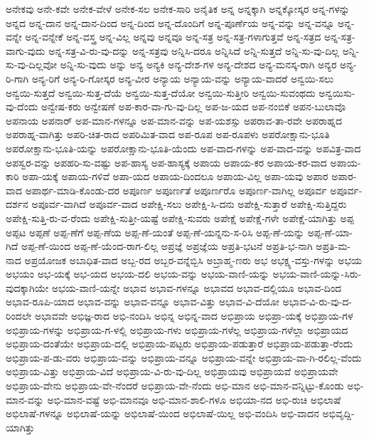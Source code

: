 ಅನೇಕವು
ಅನೇ-ಕವೇ
ಅನೇಕ-ವೇಳೆ
ಅನೇಕ-ಸಲ
ಅನೇಕ-ಸಾರಿ
ಅನೈತಿಕ
ಅನ್ನ
ಅನ್ನಕ್ಕಾಗಿ
ಅನ್ನಕ್ಕೋಸ್ಕರ
ಅನ್ನ-ಗಳನ್ನು
ಅನ್ನದ
ಅನ್ನ-ದಾನ
ಅನ್ನ-ದಾನ-ದಿಂದ
ಅನ್ನ-ದಿಂದ
ಅನ್ನ-ದೊಂದಿಗೆ
ಅನ್ನ-ಪೂರ್ಣೆಯ
ಅನ್ನ-ವನ್ನು
ಅನ್ನ-ವನ್ನೂ
ಅನ್ನ-ವನ್ನೇ
ಅನ್ನ-ವನ್ನೇಕೆ
ಅನ್ನ-ವಸ್ತ್ರ
ಅನ್ನ-ವಿಲ್ಲ
ಅನ್ನವು
ಅನ್ನವೂ
ಅನ್ನ-ಸತ್ರ
ಅನ್ನ-ಸತ್ರ-ಗಳಾಗುತ್ತವೆ
ಅನ್ನ-ಸತ್ರದ
ಅನ್ನ-ಸತ್ರ-ವಾಗು-ವುದು
ಅನ್ನ-ಸತ್ರ-ವಿ-ರು-ವು-ದನ್ನು
ಅನ್ನ-ಸತ್ರವು
ಅನ್ನಿಸಿ-ದರೂ
ಅನ್ನಿಸಿದೆ
ಅನ್ನಿ-ಸುತ್ತದೆ
ಅನ್ನಿ-ಸು-ವು-ದಿಲ್ಲ
ಅನ್ನಿ-ಸು-ವು-ದಿಲ್ಲವೋ
ಅನ್ನಿ-ಸು-ವುದು
ಅನ್ನು
ಅನ್ಯ
ಅನ್ಯಕಿ
ಅನ್ಯ-ದೇಶ-ಗಳ
ಅನ್ಯ-ದೇಶದ
ಅನ್ಯ-ಮನಸ್ಕ-ರಾಗಿ
ಅನ್ಯರ
ಅನ್ಯ-ರಿ-ಗಾಗಿ
ಅನ್ಯ-ರಿಗೆ
ಅನ್ಯ-ರಿ-ಗೋಸ್ಕರ
ಅನ್ಯ-ವೀರ
ಅನ್ಯಾಯ
ಅನ್ಯಾಯ-ವನ್ನು
ಅನ್ಯಾಯ-ವಾದರೆ
ಅನ್ವಯಿ-ಸಲು
ಅನ್ವಯಿ-ಸುತ್ತದೆ
ಅನ್ವಯಿ-ಸುತ್ತ-ದೆಯೆ
ಅನ್ವಯಿ-ಸುತ್ತ-ದೆಯೋ
ಅನ್ವಯಿ-ಸುತ್ತೀರಿ
ಅನ್ವಯಿ-ಸುವಂಥದು
ಅನ್ವಯಿಸು-ವು-ದೆಂದು
ಅನ್ವೇಷ-ಕರು
ಅನ್ವೇಷಣೆ
ಅಪ-ಕಾರ-ವಾ-ಗು-ವು-ದಿಲ್ಲ
ಅಪ-ಜ-ಯದ
ಅಪ-ನಂಬಿಕೆ
ಅಪನ-ಬುಲಾವೊ
ಅಪನಾಯ
ಅಪನಾರ್
ಅಪ-ಮಾನ-ಗಳನ್ನೂ
ಅಪ-ಮಾನ-ವನ್ನು
ಅಪ-ಯಶಸ್ಸು
ಅಪರಾವ-ತಾ-ರವೇ
ಅಪರಾಹ್ನದ
ಅಪರಾಹ್ನ-ವಾಗಿತ್ತು
ಅಪರಿ-ಚಿತ-ರಾದ
ಅಪರಿಮಿತ-ವಾದ
ಅಪ-ರೂಪ
ಅಪ-ರೂಪಳು
ಅಪರೋಕ್ಷಾನು-ಭೂತಿ
ಅಪರೋಕ್ಷಾನು-ಭೂತಿ-ಯನ್ನು
ಅಪರೋಕ್ಷಾನು-ಭೂತಿ-ಯೆಂದು
ಅಪ-ವಾದ-ಗಳನ್ನು
ಅಪ-ವಾದ-ವನ್ನು
ಅಪವಿತ್ರ-ವಾದ
ಅಪಸ್ವರ-ವನ್ನು
ಅಪಹರಿ-ಸು-ವಷ್ಟು
ಅಪ-ಹಾಸ್ಯ
ಅಪ-ಹಾಸ್ಯಕ್ಕೆ
ಅಪಾಯ
ಅಪಾಯ-ಕರ
ಅಪಾಯ-ಕರ-ವಾದ
ಅಪಾಯ-ಕಾರಿ
ಅಪಾ-ಯಕ್ಕೆ
ಅಪಾಯ-ಗಳಿವೆ
ಅಪಾ-ಯದ
ಅಪಾಯ-ದಿಂದಲೂ
ಅಪಾಯ-ವಿಲ್ಲ
ಅಪಾ-ಯವು
ಅಪಾರ
ಅಪಾರ-ವಾದ
ಅಪಾರ್ಥ-ಮಾಡಿ-ಕೊಂಡು-ದರ
ಅಪೂರ್ಣ
ಅಪೂರ್ಣತೆ
ಅಪೂರ್ಣರೊ
ಅಪೂರ್ಣ-ವಾಗಿಲ್ಲ
ಅಪೂರ್ವ
ಅಪೂರ್ವ-ದರ್ಶನ
ಅಪೂರ್ವ-ವಾಗಿದೆ
ಅಪೂರ್ವ-ವಾದ
ಅಪೇಕ್ಷಿ-ಸಲು
ಅಪೇಕ್ಷಿ-ಸಿ-ದನು
ಅಪೇಕ್ಷಿ-ಸುತ್ತಾರೆ
ಅಪೇಕ್ಷಿ-ಸುತ್ತಿದ್ದರು
ಅಪೇಕ್ಷಿ-ಸುತ್ತಿ-ರು-ವ-ರೆಂದು
ಅಪೇಕ್ಷಿ-ಸುತ್ತೀ-ಯಷ್ಟೆ
ಅಪೇಕ್ಷಿ-ಸುವರು
ಅಪೇಕ್ಷೆ
ಅಪೇಕ್ಷೆ-ಗಳೇ
ಅಪೇಕ್ಷೆ-ಯಾಗಿತ್ತು
ಅಪ್ಪ
ಅಪ್ಪಟ
ಅಪ್ಪಣೆ
ಅಪ್ಪ-ಣೆಗೆ
ಅಪ್ಪ-ಣೆಯ
ಅಪ್ಪ-ಣೆ-ಯಂತೆ
ಅಪ್ಪ-ಣೆ-ಯನ್ನನು-ಸ-ರಿಸಿ
ಅಪ್ಪ-ಣೆ-ಯನ್ನು
ಅಪ್ಪ-ಣೆ-ಯಾ-ಗಿದೆ
ಅಪ್ಪ-ಣೆ-ಯಿಂದ
ಅಪ್ಪ-ಣೆ-ಯೆಂದ-ರಾಗ-ಲಿಲ್ಲ
ಅಪ್ರಜ್ಞೆ
ಅಪ್ರಜ್ಞೆಯ
ಅಪ್ರತಿ-ಭಟನೆ
ಅಪ್ರತಿ-ಭ-ನಾಗಿ
ಅಪ್ರತಿ-ಮ-ನಾದ
ಅಪ್ರಯೋಜಕ
ಅಬಾಧಿತ-ವಾದ
ಅಬ್ಬ-ರದ
ಅಬ್ಬರ-ವನ್ನೆಬ್ಬಿಸಿ
ಅಬ್ರಾಹ್ಮ-ಣರು
ಅಭ
ಅಭಕ್ಷ್ಯ-ವಸ್ತು-ಗಳನ್ನು
ಅಭಯ
ಅಭಯಂ
ಅಭ-ಯಕ್ಕೆ
ಅಭ-ಯದ
ಅಭಯ-ದಲಿ
ಅಭಯ-ವನ್ನು
ಅಭಯ-ವಾಣಿ-ಯನ್ನು
ಅಭಯ-ವಾಣಿ-ಯನ್ನು-ಸಿರು-ವುದಕ್ಕಾಗಿಯೇ
ಅಭಯ-ವಾಣಿ-ಯನ್ನೇ
ಅಭಾವ
ಅಭಾವ-ಗಳನ್ನೂ
ಅಭಾವದ
ಅಭಾವ-ದಲ್ಲಿಯೂ
ಅಭಾವ-ದಿಂದ
ಅಭಾವ-ರೂಪಿ-ಯಾದ
ಅಭಾವ-ವನ್ನು
ಅಭಾವ-ವನ್ನೂ
ಅಭಾವ-ವಿತ್ತು
ಅಭಾವ-ವಿ-ದೆಯೋ
ಅಭಾವ-ವಿ-ರು-ವು-ದ-ರಿಂದಲೇ
ಅಭಾವವೇ
ಅಭಿಜ್ಞ-ರಾದ
ಅಭಿ-ನಂದಿಸಿ
ಅಭಿನ್ನ
ಅಭಿನ್ನ-ವಾದ
ಅಭಿಪ್ರಾಯ
ಅಭಿಪ್ರಾ-ಯಕ್ಕೆ
ಅಭಿಪ್ರಾಯ-ಗಳ
ಅಭಿಪ್ರಾಯ-ಗಳನ್ನು
ಅಭಿಪ್ರಾಯ-ಗ-ಳಲ್ಲಿ
ಅಭಿಪ್ರಾಯ-ಗಳು
ಅಭಿಪ್ರಾಯ-ಗಳೆಲ್ಲ
ಅಭಿಪ್ರಾಯ-ಗಳೆಲ್ಲಾ
ಅಭಿಪ್ರಾಯದ
ಅಭಿಪ್ರಾಯ-ದಂತೆಯೇ
ಅಭಿಪ್ರಾಯ-ದಲ್ಲಿ
ಅಭಿಪ್ರಾಯ-ಪಟ್ಟರು
ಅಭಿಪ್ರಾಯ-ಪಡುತ್ತಾರೆ
ಅಭಿಪ್ರಾಯ-ಪಡುತ್ತಾ-ರೆಂದು
ಅಭಿಪ್ರಾಯ-ಪ-ಡು-ವರು
ಅಭಿಪ್ರಾಯ-ವನ್ನು
ಅಭಿಪ್ರಾಯ-ವನ್ನೂ
ಅಭಿಪ್ರಾಯ-ವನ್ನೇ
ಅಭಿಪ್ರಾಯ-ವಾ-ಗಿ-ರಲಿಲ್ಲ-ವೆಂದು
ಅಭಿಪ್ರಾಯ-ವಿತ್ತು
ಅಭಿಪ್ರಾಯ-ವಿದೆ
ಅಭಿಪ್ರಾಯ-ವಿ-ರು-ವು-ದಿಲ್ಲ
ಅಭಿಪ್ರಾಯವು
ಅಭಿಪ್ರಾಯವೆ
ಅಭಿಪ್ರಾಯವೇ
ಅಭಿಪ್ರಾಯ-ವೇನು
ಅಭಿಪ್ರಾಯ-ವೇ-ನೆಂದರೆ
ಅಭಿಪ್ರಾಯ-ವೇ-ನೆಂದು
ಅಭಿ-ಮಾನ
ಅಭಿ-ಮಾನ-ವನ್ನಿಟ್ಟು-ಕೊಂಡು
ಅಭಿ-ಮಾನ-ವನ್ನು
ಅಭಿ-ಮಾನ-ವಷ್ಟೆ
ಅಭಿ-ಮಾನವೂ
ಅಭಿ-ಮಾನ-ಶಾಲಿ-ಗಳೂ
ಅಭಿಯಾ-ನದ
ಅಭಿ-ರುಚಿ
ಅಭಿಲಾಷೆ
ಅಭಿಲಾಷೆ-ಗಳನ್ನೂ
ಅಭಿಲಾಷೆ-ಯನ್ನು
ಅಭಿಲಾಷೆ-ಯಿಂದ
ಅಭಿಲಾಷೆ-ಯಿಲ್ಲ
ಅಭಿ-ವಂದಿಸಿ
ಅಭಿ-ವಾದನ
ಅಭಿವೃದ್ದಿ-ಯಾಗಿತ್ತು
